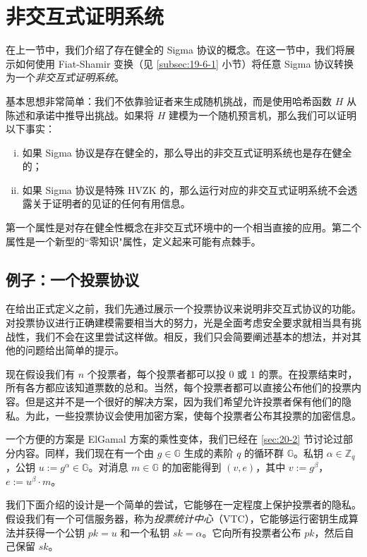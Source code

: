\section{非交互式证明系统}\label{sec:20-3}

在上一节中，我们介绍了存在健全的 Sigma 协议的概念。在这一节中，我们将展示如何使用 Fiat-Shamir 变换（见 \ref{subsec:19-6-1} 小节）将任意 Sigma 协议转换为一个\emph{非交互式证明系统}。

基本思想非常简单：我们不依靠验证者来生成随机挑战，而是使用哈希函数 $H$ 从陈述和承诺中推导出挑战。如果将 $H$ 建模为一个随机预言机，那么我们可以证明以下事实：
\begin{enumerate}[(i)]
	\item 如果 Sigma 协议是存在健全的，那么导出的非交互式证明系统也是存在健全的；
	\item 如果 Sigma 协议是特殊 HVZK 的，那么运行对应的非交互式证明系统不会透露关于证明者的见证的任何有用信息。
\end{enumerate}

第一个属性是对存在健全性概念在非交互式环境中的一个相当直接的应用。第二个属性是一个新型的``零知识"属性，定义起来可能有点棘手。

\subsection{例子：一个投票协议}

在给出正式定义之前，我们先通过展示一个投票协议来说明非交互式协议的功能。对投票协议进行正确建模需要相当大的努力，光是全面考虑安全要求就相当具有挑战性，我们不会在这里尝试这样做。相反，我们只会简要阐述基本的想法，并对其他的问题给出简单的提示。

现在假设我们有 $n$ 个投票者，每个投票者都可以投 $0$ 或 $1$ 的票。在投票结束时，所有各方都应该知道票数的总和。当然，每个投票者都可以直接公布他们的投票内容。但是这并不是一个很好的解决方案，因为我们希望允许投票者保有他们的隐私。为此，一些投票协议会使用加密方案，使每个投票者公布其投票的加密信息。

一个方便的方案是 ElGamal 方案的乘性变体，我们已经在 \ref{sec:20-2} 节讨论过部分内容。同样，我们现在有一个由 $g\in\mathbb{G}$ 生成的素阶 $q$ 的循环群 $\mathbb{G}$。私钥 $\alpha\in\mathbb{Z}_q$，公钥 $u:=g^\alpha\in\mathbb{G}$。对消息 $m\in\mathbb{G}$ 的加密能得到 $(v,e)$，其中 $v:=g^\beta$，$e:=u^\beta\cdot m$。

我们下面介绍的设计是一个简单的尝试，它能够在一定程度上保护投票者的隐私。假设我们有一个可信服务器，称为\emph{投票统计中心}（VTC），它能够运行密钥生成算法并获得一个公钥 $pk=u$ 和一个私钥 $sk=\alpha$。它向所有投票者公布 $pk$，然后自己保留 $sk$。

